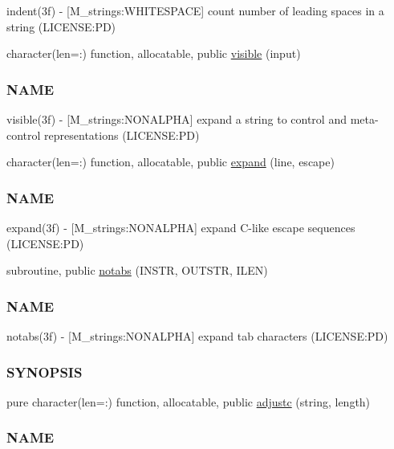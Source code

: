 \begin{DoxyCompactItemize}
\begin{DoxyCompactList}
indent(3f) -\/ \mbox{[}M\+\_\+strings\+:W\+H\+I\+T\+E\+S\+P\+A\+CE\mbox{]} count number of leading spaces in a string (L\+I\+C\+E\+N\+SE\+:PD) \end{DoxyCompactList}\item 
character(len=\+:) function, allocatable, public \mbox{\hyperlink{namespacem__strings_a791e24ceb690010fd42a6c1f48311b55}{visible}} (input)
\begin{DoxyCompactList}\small\item\em \subsubsection*{N\+A\+ME}

visible(3f) -\/ \mbox{[}M\+\_\+strings\+:N\+O\+N\+A\+L\+P\+HA\mbox{]} expand a string to control and meta-\/control representations (L\+I\+C\+E\+N\+SE\+:PD) \end{DoxyCompactList}\item 
character(len=\+:) function, allocatable, public \mbox{\hyperlink{namespacem__strings_a33b248107c1521272b55cda5c4077378}{expand}} (line, escape)
\begin{DoxyCompactList}\small\item\em \subsubsection*{N\+A\+ME}

expand(3f) -\/ \mbox{[}M\+\_\+strings\+:N\+O\+N\+A\+L\+P\+HA\mbox{]} expand C-\/like escape sequences (L\+I\+C\+E\+N\+SE\+:PD) \end{DoxyCompactList}\item 
subroutine, public \mbox{\hyperlink{namespacem__strings_a3bf44ac06a670f55830e17a6f1108b9c}{notabs}} (I\+N\+S\+TR, O\+U\+T\+S\+TR, I\+L\+EN)
\begin{DoxyCompactList}\small\item\em \subsubsection*{N\+A\+ME}

notabs(3f) -\/ \mbox{[}M\+\_\+strings\+:N\+O\+N\+A\+L\+P\+HA\mbox{]} expand tab characters (L\+I\+C\+E\+N\+SE\+:PD) \subsubsection*{S\+Y\+N\+O\+P\+S\+IS}\end{DoxyCompactList}\item 
pure character(len=\+:) function, allocatable, public \mbox{\hyperlink{namespacem__strings_a1cacb2e45c7e3d7ed4cc1b183c35f323}{adjustc}} (string, length)
\begin{DoxyCompactList}\small\item\em \subsubsection*{N\+A\+ME}


\end{DoxyCompactList}
\end{DoxyCompactItemize}
